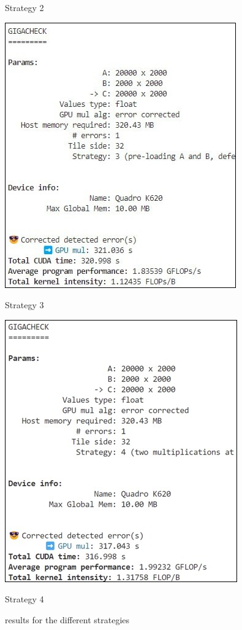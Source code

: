 \begin{figure}[h]
	\caption*{Strategy 2}
	\endminipage\hfill
	\linebreak
	\vspace{.02\textwidth}
	\linebreak
	\includegraphics[width=\textwidth]{images/result_s3}
	\caption*{Strategy 3}
	\endminipage\hfill
	\includegraphics[width=\textwidth]{images/result_s4}
	\caption*{Strategy 4}
	\endminipage\hfill
	\caption{\centering results for the different strategies}\label{img:results-strategies}
\end{figure}

